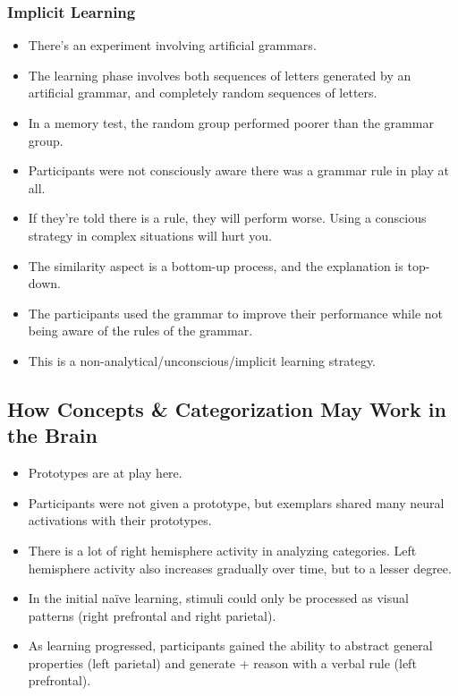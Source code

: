 \documentclass[]{article}
\begin{document}
			\subsubsection{Implicit Learning}
				\begin{itemize}
					\item There's an experiment involving artificial grammars.
					\item The learning phase involves both sequences of letters generated by an artificial grammar, and completely random sequences of letters.
					\item In a memory test, the random group performed poorer than the grammar group.
					\item Participants were not consciously aware there was a grammar rule in play at all.
					\item If they're told there is a rule, they will perform worse. Using a conscious strategy in complex situations will hurt you.
					\item The similarity aspect is a bottom-up process, and the explanation is top-down.
					\item The participants used the grammar to improve their performance while not being aware of the rules of the grammar.
					\item This is a non-analytical/unconscious/implicit learning strategy.
				\end{itemize}

			\subsection{How Concepts \& Categorization May Work in the Brain}
				\begin{itemize}
					\item Prototypes are at play here.
					\item Participants were not given a prototype, but exemplars shared many neural activations with their prototypes.
					\item There is a lot of right hemisphere activity in analyzing categories. Left hemisphere activity also increases gradually over time, but to a lesser degree.
					\item In the initial na\"ive learning, stimuli could only be processed as visual patterns (right prefrontal and right parietal).
					\item As learning progressed, participants gained the ability to abstract general properties (left parietal) and generate + reason with a verbal rule (left prefrontal).
				\end{itemize}
\end{document}

